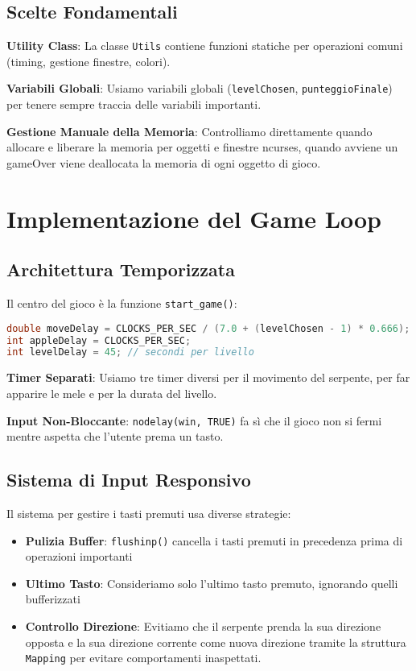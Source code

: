 \documentclass[a4paper,12pt]{article}
\begin{document}
\subsection{Scelte Fondamentali}

\textbf{Utility Class}: La classe \texttt{Utils} contiene funzioni statiche per operazioni comuni (timing, gestione finestre, colori).

\textbf{Variabili Globali}: Usiamo variabili globali (\texttt{levelChosen}, \texttt{punteggioFinale}) per tenere sempre traccia delle variabili importanti.

\textbf{Gestione Manuale della Memoria}: Controlliamo direttamente quando allocare e liberare la memoria per oggetti e finestre ncurses, quando avviene un gameOver viene deallocata la memoria di ogni oggetto di gioco.

\section{Implementazione del Game Loop}

\subsection{Architettura Temporizzata}

Il centro del gioco è la funzione \texttt{start\_game()}:

\begin{lstlisting}[language=C++]
double moveDelay = CLOCKS_PER_SEC / (7.0 + (levelChosen - 1) * 0.666);
int appleDelay = CLOCKS_PER_SEC;
int levelDelay = 45; // secondi per livello
\end{lstlisting}

\textbf{Timer Separati}: Usiamo tre timer diversi per il movimento del serpente, per far apparire le mele e per la durata del livello.

\textbf{Input Non-Bloccante}: \texttt{nodelay(win, TRUE)} fa sì che il gioco non si fermi mentre aspetta che l'utente prema un tasto.

\subsection{Sistema di Input Responsivo}

Il sistema per gestire i tasti premuti usa diverse strategie:

\begin{itemize}
    \item \textbf{Pulizia Buffer}: \texttt{flushinp()} cancella i tasti premuti in precedenza prima di operazioni importanti
    \item \textbf{Ultimo Tasto}: Consideriamo solo l'ultimo tasto premuto, ignorando quelli bufferizzati
    \item \textbf{Controllo Direzione}: Evitiamo che il serpente prenda la sua direzione opposta e la sua direzione corrente come nuova direzione tramite la struttura \texttt{Mapping} per evitare comportamenti inaspettati. 
\end{itemize}
\end{document}
